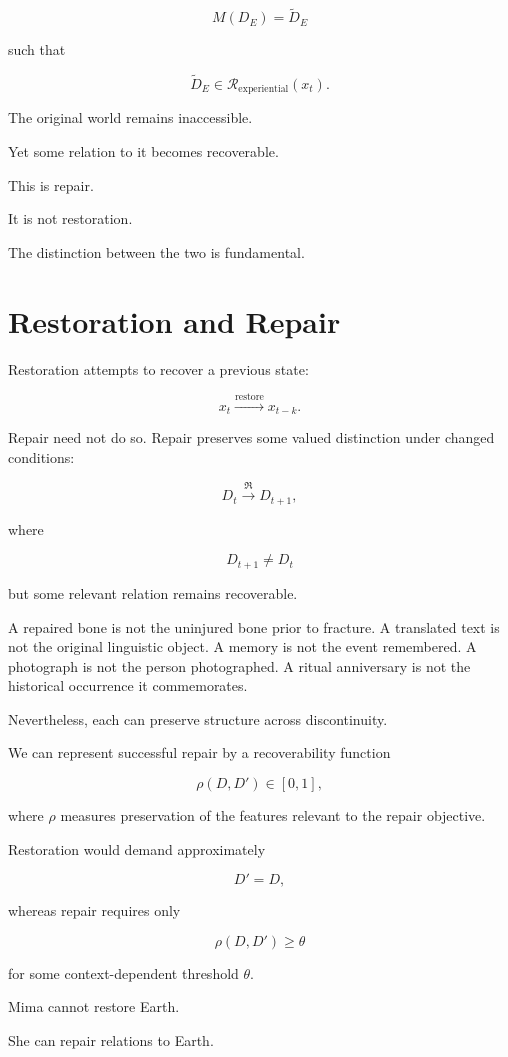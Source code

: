 \documentclass[11pt,oneside]{book}
\theoremstyle{definition}
\theoremstyle{remark}
\newcommand{\R}{\mathcal{R}}
\newcommand{\Repair}{\mathfrak{R}}
\begin{document}
\[
M(D_E)=\widetilde D_E
\]

such that

\[
\widetilde D_E\in\R_{\mathrm{experiential}}(x_t).
\]

The original world remains inaccessible.

Yet some relation to it becomes recoverable.

This is repair.

It is not restoration.

The distinction between the two is fundamental.

\section{Restoration and Repair}

Restoration attempts to recover a previous state:

\[
x_t\xrightarrow{\mathrm{restore}}x_{t-k}.
\]

Repair need not do so. Repair preserves some valued distinction under changed conditions:

\[
D_t\xrightarrow{\Repair}D_{t+1},
\]

where

\[
D_{t+1}\neq D_t
\]

but some relevant relation remains recoverable.

A repaired bone is not the uninjured bone prior to fracture. A translated text is not the original linguistic object. A memory is not the event remembered. A photograph is not the person photographed. A ritual anniversary is not the historical occurrence it commemorates.

Nevertheless, each can preserve structure across discontinuity.

We can represent successful repair by a recoverability function

\[
\rho(D,D')
\in[0,1],
\]

where \(\rho\) measures preservation of the features relevant to the repair objective.

Restoration would demand approximately

\[
D'=D,
\]

whereas repair requires only

\[
\rho(D,D')\geq\theta
\]

for some context-dependent threshold \(\theta\).

Mima cannot restore Earth.

She can repair relations to Earth.
\end{document}
